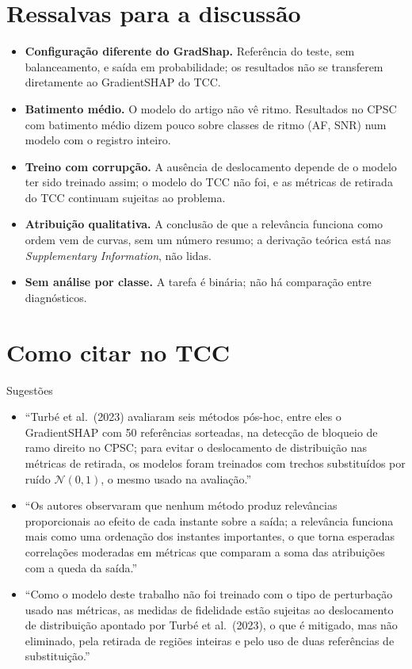 \documentclass[11pt,a4paper]{article}
\begin{document}
\section{Ressalvas para a discussão}
\begin{itemize}
\item \textbf{Configuração diferente do GradShap.} Referência do teste, sem balanceamento, e saída em probabilidade; os resultados não se transferem diretamente ao GradientSHAP do TCC.
\item \textbf{Batimento médio.} O modelo do artigo não vê ritmo. Resultados no CPSC com batimento médio dizem pouco sobre classes de ritmo (AF, SNR) num modelo com o registro inteiro.
\item \textbf{Treino com corrupção.} A ausência de deslocamento depende de o modelo ter sido treinado assim; o modelo do TCC não foi, e as métricas de retirada do TCC continuam sujeitas ao problema.
\item \textbf{Atribuição qualitativa.} A conclusão de que a relevância funciona como ordem vem de curvas, sem um número resumo; a derivação teórica está nas \textit{Supplementary Information}, não lidas.
\item \textbf{Sem análise por classe.} A tarefa é binária; não há comparação entre diagnósticos.
\end{itemize}

\section{Como citar no TCC}
\begin{infobox}[ok]{Sugestões}
\begin{itemize}
\item “Turbé et al.\ (2023) avaliaram seis métodos pós-hoc, entre eles o GradientSHAP com 50 referências sorteadas, na detecção de bloqueio de ramo direito no CPSC; para evitar o deslocamento de distribuição nas métricas de retirada, os modelos foram treinados com trechos substituídos por ruído $\mathcal{N}(0,1)$, o mesmo usado na avaliação.”
\item “Os autores observaram que nenhum método produz relevâncias proporcionais ao efeito de cada instante sobre a saída; a relevância funciona mais como uma ordenação dos instantes importantes, o que torna esperadas correlações moderadas em métricas que comparam a soma das atribuições com a queda da saída.”
\item “Como o modelo deste trabalho não foi treinado com o tipo de perturbação usado nas métricas, as medidas de fidelidade estão sujeitas ao deslocamento de distribuição apontado por Turbé et al.\ (2023), o que é mitigado, mas não eliminado, pela retirada de regiões inteiras e pelo uso de duas referências de substituição.”
\end{itemize}
\end{infobox}
\end{document}
